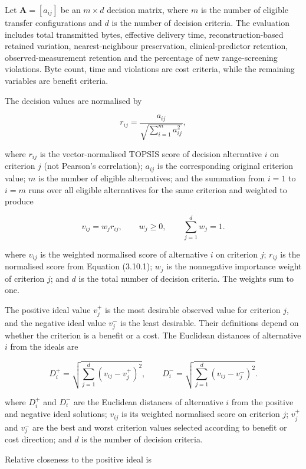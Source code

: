 \noindent Let \(\boldsymbol{A}=[a_{ij}]\) be an \(m\times d\) decision matrix,
where \(m\) is the number of eligible transfer configurations and \(d\)
is the number of decision criteria. The evaluation includes total
transmitted bytes, effective delivery time, reconstruction-based
retained variation, nearest-neighbour preservation, clinical-predictor
retention, observed-measurement retention and the percentage of new
range-screening violations. Byte count, time and violations are cost
criteria, while the remaining variables are benefit criteria.

\noindent The decision values are normalised by

\[
r_{ij}=\frac{a_{ij}}{\sqrt{\sum_{i=1}^{m}a_{ij}^2}},\tag{3.10.1}
\]

\noindent where \(r_{ij}\) is the vector-normalised TOPSIS score of decision
alternative \(i\) on criterion \(j\) (not Pearson's correlation);
\(a_{ij}\) is the corresponding original criterion value; \(m\) is the
number of eligible alternatives; and the summation from \(i=1\) to
\(i=m\) runs over all eligible alternatives for the same criterion and weighted to produce

\[
v_{ij}=w_jr_{ij},
\qquad w_j\ge0,\qquad\sum_{j=1}^{d}w_j=1.\tag{3.10.2}
\]

\noindent where \(v_{ij}\) is the weighted normalised score of alternative \(i\)
on criterion \(j\); \(r_{ij}\) is the normalised score from Equation
(3.10.1); \(w_j\) is the nonnegative importance weight of criterion
\(j\); and \(d\) is the total number of decision criteria. The weights
sum to one.

\noindent The positive ideal value \(v_j^+\) is the most desirable observed value
for criterion \(j\), and the negative ideal value \(v_j^-\) is the least
desirable. Their definitions depend on whether the criterion is a
benefit or a cost. The Euclidean distances of alternative \(i\) from the
ideals are

\[
D_i^+=\sqrt{\sum_{j=1}^{d}(v_{ij}-v_j^+)^2},
\qquad
D_i^-=\sqrt{\sum_{j=1}^{d}(v_{ij}-v_j^-)^2}.\tag{3.10.3}
\]

\noindent where \(D_i^+\) and \(D_i^-\) are the Euclidean distances of alternative
\(i\) from the positive and negative ideal solutions; \(v_{ij}\) is its
weighted normalised score on criterion \(j\); \(v_j^+\) and \(v_j^-\)
are the best and worst criterion values selected according to benefit or
cost direction; and \(d\) is the number of decision criteria.

\noindent Relative closeness to the positive ideal is

